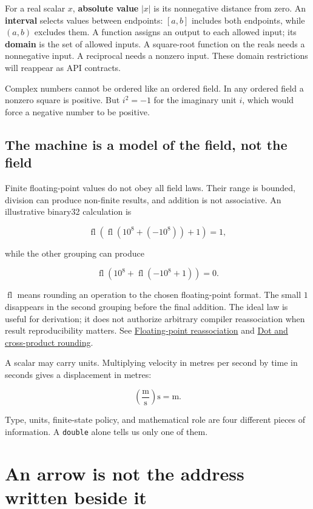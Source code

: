 For a real scalar \(x\), \textbf{absolute value} \(|x|\) is its nonnegative distance from zero. An \textbf{interval} selects values between endpoints: \([a,b]\) includes both endpoints, while \((a,b)\) excludes them. A function assigns an output to each allowed input; its \textbf{domain} is the set of allowed inputs. A square-root function on the reals needs a nonnegative input. A reciprocal needs a nonzero input. These domain restrictions will reappear as API contracts.

Complex numbers cannot be ordered like an ordered field. In any ordered field a nonzero square is positive. But \(i^2=-1\) for the imaginary unit \(i\), which would force a negative number to be positive.

\subsection{The machine is a model of the field, not the field}\label{01-foundations-i-ch017-the-machine-is-a-model-of-the-field-not-the-field}

Finite floating-point values do not obey all field laws. Their range is bounded, division can produce non-finite results, and addition is not associative. An illustrative binary32 calculation is

\[
\operatorname{fl}\!\left(\operatorname{fl}(10^8+(-10^8))+1\right)=1,
\]

while the other grouping can produce

\[
\operatorname{fl}\!\left(10^8+\operatorname{fl}(-10^8+1)\right)=0.
\]

\(\operatorname{fl}\) means rounding an operation to the chosen floating-point format. The small \(1\) disappears in the second grouping before the final addition. The ideal law is useful for derivation; it does not authorize arbitrary compiler reassociation when result reproducibility matters. See \hyperref[appendix-c2ac4a84c283]{Floating-point reassociation} and \hyperref[appendix-5aef4f13483a]{Dot and cross-product rounding}.

A scalar may carry units. Multiplying velocity in metres per second by time in seconds gives a displacement in metres:

\[
\left(\frac{\mathrm m}{\mathrm s}\right)\mathrm s=\mathrm m.
\]

Type, units, finite-state policy, and mathematical role are four different pieces of information. A \texttt{double} alone tells us only one of them.

\section{An arrow is not the address written beside it}\label{01-foundations-i-ch017-an-arrow-is-not-the-address-written-beside-it}


